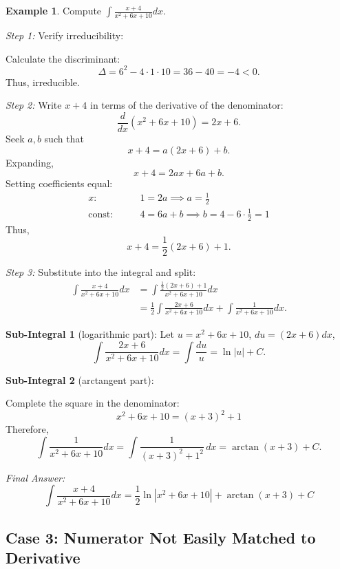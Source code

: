 \documentclass[11pt]{article}
\theoremstyle{definition}
\newtheorem{examplex}{Example}[section]
\theoremstyle{plain}
\begin{document}
\begin{examplex}\label{ex:irredquad}
    Compute $\displaystyle \int \frac{x+4}{x^2 + 6x + 10} dx$.
    
    \emph{Step 1:} Verify irreducibility:

    Calculate the discriminant:
    \[
        \Delta = 6^2 - 4 \cdot 1 \cdot 10 = 36 - 40 = -4 < 0.
    \]
    Thus, irreducible.

    \emph{Step 2:} Write $x+4$ in terms of the derivative of the denominator:
    \[
        \frac{d}{dx}(x^2 + 6x + 10) = 2x + 6.
    \]
    Seek $a, b$ such that
    \[
        x + 4 = a(2x+6) + b.
    \]
    Expanding,
    \[
        x + 4 = 2a x + 6a + b.
    \]
    Setting coefficients equal:
    \begin{align*}
        x: &\qquad 1 = 2a \implies a = \frac{1}{2} \\
        \text{const:} &\qquad 4 = 6a + b \implies b = 4 - 6\cdot\frac{1}{2} = 1
    \end{align*}
    Thus,
    \[
        x + 4 = \frac{1}{2}(2x + 6) + 1.
    \]

    \emph{Step 3:} Substitute into the integral and split:
    \begin{align*}
        \int \frac{x+4}{x^2 + 6x + 10} dx 
        &= \int \frac{\frac{1}{2}(2x+6) + 1}{x^2 + 6x + 10} dx\\
        &= \frac{1}{2} \int \frac{2x + 6}{x^2 + 6x + 10} dx + \int \frac{1}{x^2 + 6x + 10} dx.
    \end{align*}

    \textbf{Sub-Integral 1} (logarithmic part): Let $u = x^2 + 6x + 10$, $du = (2x+6)dx$,
    \[
        \int \frac{2x+6}{x^2 + 6x + 10} dx = \int \frac{du}{u} = \ln|u| + C.
    \]

    \textbf{Sub-Integral 2} (arctangent part):

    Complete the square in the denominator:
    \[
        x^2 + 6x + 10 = (x+3)^2 + 1
    \]
    Therefore,
    \[
        \int \frac{1}{x^2 + 6x + 10} dx = \int \frac{1}{(x+3)^2 + 1^2}\, dx = \arctan(x+3) + C.
    \]

    \emph{Final Answer:}
    \[
        \int \frac{x+4}{x^2 + 6x + 10} dx = \frac{1}{2} \ln|x^2 + 6x + 10| + \arctan(x+3) + C
    \]
\end{examplex}

\subsection{Case 3: Numerator Not Easily Matched to Derivative}
\end{document}
